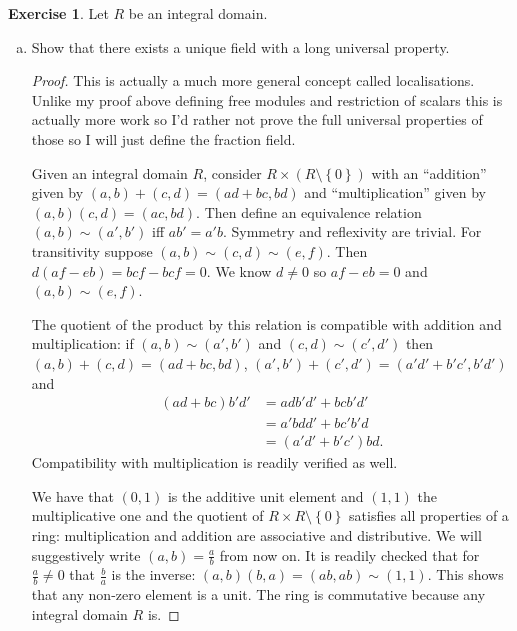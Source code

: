 \documentclass{article}
\newcommand{\set}[1]{\left\{#1\right\}}
\theoremstyle{definition}
\newtheorem{question}{Exercise}
\begin{document}
\begin{question}
    Let \(R\) be an integral domain.

    \begin{enumerate}[(a)]
        \item Show that there exists a unique field with a long universal
              property.

              \begin{proof}
                  This is actually a much more general concept called
                  localisations. Unlike my proof above defining free modules and
                  restriction of scalars this is actually more work so I'd
                  rather not prove the full universal properties of those so I
                  will just define the fraction field.

                  Given an integral domain \(R\), consider \(R\times
                  (R\setminus\set{0})\) with an ``addition'' given by
                  \((a,b)+(c,d)=(ad+bc,bd)\) and ``multiplication'' given by
                  \((a,b)(c,d)=(ac,bd)\). Then define an equivalence relation
                  \((a,b)\sim(a',b')\) iff \(ab'=a'b\). Symmetry and reflexivity
                  are trivial. For transitivity suppose
                  \((a,b)\sim(c,d)\sim(e,f)\). Then \(d(af-eb)=bcf-bcf=0\). We
                  know \(d\neq 0\) so \(af-eb=0\) and \((a,b)\sim(e,f)\).

                  The quotient of the product by this relation is compatible
                  with addition and multiplication: if \((a,b)\sim(a',b')\) and
                  \((c,d)\sim (c',d')\) then \((a,b)+(c,d)=(ad+bc,bd)\),
                  \((a',b')+(c',d')=(a'd'+b'c',b'd')\) and
                  \begin{align*}
                      (ad+bc)b'd' & =adb'd'+bcb'd'  \\
                                  & =a'bdd'+bc'b'd  \\
                                  & =(a'd'+b'c')bd.
                  \end{align*}
                  Compatibility with multiplication is readily verified as well.

                  We have that \((0,1)\) is the additive unit element and
                  \((1,1)\) the multiplicative one and the quotient of \(R\times
                  R\setminus\set{0}\) satisfies all properties of a ring:
                  multiplication and addition are associative and distributive.
                  We will suggestively write \((a,b)=\frac{a}{b}\) from now on.
                  It is readily checked that for \(\frac{a}{b}\neq0\) that
                  \(\frac{b}{a}\) is the inverse:
                  \((a,b)(b,a)=(ab,ab)\sim(1,1)\). This shows that any non-zero
                  element is a unit. The ring is commutative because any
                  integral domain \(R\) is.


\end{proof}
\end{enumerate}
\end{question}
\end{document}
